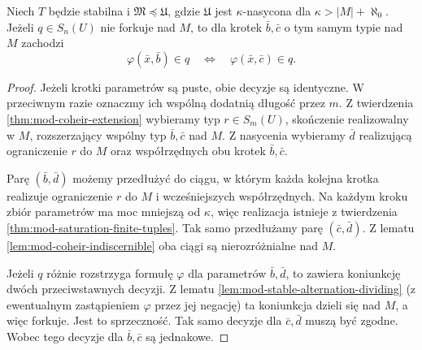 \begin{lemat}
\label{lem:mod-nonforking-model-invariance}
Niech $T$ będzie stabilna i
$\mathfrak M\preccurlyeq\mathfrak U$, gdzie
$\mathfrak U$ jest $\kappa$-nasycona dla
$\kappa>|M|+\aleph_0$.
Jeżeli $q\in S_n(U)$ nie forkuje nad $M$,
to dla krotek $\bar b,\bar c$ o tym samym
typie nad $M$ zachodzi
\[
\varphi(\bar x,\bar b)\in q
\quad\Longleftrightarrow\quad
\varphi(\bar x,\bar c)\in q.
\]
\end{lemat}
\begin{proof}
Jeżeli krotki parametrów są puste, obie decyzje
są identyczne. W przeciwnym razie oznaczmy ich
wspólną dodatnią długość przez $m$.
Z twierdzenia \ref{thm:mod-coheir-extension}
wybieramy typ $r\in S_m(U)$, skończenie
realizowalny w $M$, rozszerzający wspólny
typ $\bar b,\bar c$ nad $M$.
Z nasycenia wybieramy $\bar d$ realizującą
ograniczenie $r$ do $M$ oraz współrzędnych
obu krotek $\bar b,\bar c$.

Parę $(\bar b,\bar d)$ możemy przedłużyć
do ciągu, w którym każda kolejna krotka
realizuje ograniczenie $r$ do $M$
i wcześniejszych współrzędnych.
Na każdym kroku zbiór parametrów ma
moc mniejszą od $\kappa$, więc realizacja
istnieje z twierdzenia
\ref{thm:mod-saturation-finite-tuples}.
Tak samo przedłużamy parę $(\bar c,\bar d)$.
Z lematu \ref{lem:mod-coheir-indiscernible}
oba ciągi są nierozróżnialne nad $M$.

Jeżeli $q$ różnie rozstrzyga formułę
$\varphi$ dla parametrów $\bar b,\bar d$,
to zawiera koniunkcję dwóch przeciwstawnych
decyzji. Z lematu
\ref{lem:mod-stable-alternation-dividing}
(z ewentualnym zastąpieniem $\varphi$ przez
jej negację) ta koniunkcja dzieli się nad $M$,
a więc forkuje. Jest to sprzeczność.
Tak samo decyzje dla $\bar c,\bar d$
muszą być zgodne. Wobec tego decyzje
dla $\bar b,\bar c$ są jednakowe.
\end{proof}

